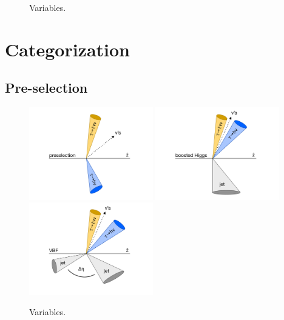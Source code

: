 \begin{figure}[tp]
  \caption{Variables.}
  \label{fig:strategy-objects-btag}
\end{figure}

\section{Categorization}
\label{sec:strategy-categorization}

\subsection{Pre-selection}
\label{sec:strategy-preselection}

\begin{figure}[tp]
  \centering
  \includegraphics[width=0.48\textwidth]{figures/category-cartoons/presel}
  \includegraphics[width=0.48\textwidth]{figures/category-cartoons/boost}
  \includegraphics[width=0.48\textwidth]{figures/category-cartoons/vbf}
  \caption{Variables.}
  \label{fig:strategy-category-cartoons}
\end{figure}

\clearpage

